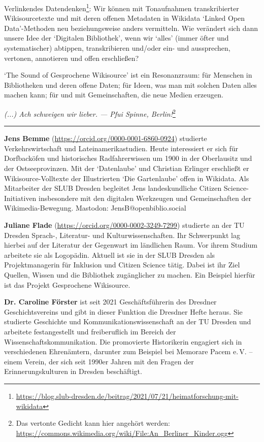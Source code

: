 \documentclass[a4paper,
fontsize=11pt,
oneside,
numbers=noperiodatend,
parskip=half-,
bibliography=totoc,
final
]{scrartcl}
\begin{document}
Verlinkendes Datendenken\footnote{\url{https://blog.slub-dresden.de/beitrag/2021/07/21/heimatforschung-mit-wikidata}}:
Wir können mit Tonaufnahmen transkribierter Wikisourcetexte und mit
deren offenen Metadaten in Wikidata \enquote*{Linked Open Data}-Methoden
neu beziehungsweise anders vermitteln. Wie verändert sich dann unsere
Idee der \enquote*{Digitalen Bibliothek}, wenn wir \enquote*{alles}
(immer öfter und systematischer) abtippen, transkribieren und/oder ein-
und aussprechen, vertonen, annotieren und offen erschließen?

\enquote*{The Sound of Gesprochene Wikisource} ist ein Resonanzraum: für
Menschen in Bibliotheken und deren offene Daten; für Ideen, was man mit
solchen Daten alles machen kann; für und mit Gemeinschaften, die neue
Medien erzeugen.

\begin{center}
\emph{(...) Ach schweigen wir lieber. --- Pfui Spinne, Berlin!}\footnote{Das vertonte Gedicht kann hier angehört werden: \url{https://commons.wikimedia.org/wiki/File:An\_Berliner\_Kinder.ogg}}
\end{center}

\begin{center}\rule{0.5\linewidth}{0.5pt}\end{center}

\textbf{Jens Bemme} (\url{https://orcid.org/0000-0001-6860-0924}) studierte Verkehrswirtschaft und Lateinamerikastudien. Heute interessiert er sich für Dorfbacköfen 
und historisches Radfahrerwissen um 1900 in der Oberlausitz und der Ostseeprovinzen. Mit der \enquote*{Datenlaube} und 
Christian Erlinger erschließt er Wikisource-Volltexte der Illustrierten \enquote*{Die Gartenlaube} offen in Wikidata. 
Als Mitarbeiter der SLUB Dresden begleitet Jens landeskundliche Citizen Science-Initiativen insbesondere mit 
den digitalen Werkzeugen und Gemeinschaften der Wikimedia-Bewegung. Mastodon: JensB@openbiblio.social


\textbf{Juliane Flade} (\url{https://orcid.org/0000-0002-3249-7299}) studierte an der TU Dresden Sprach-, Literatur- und Kulturwissenschaften. Ihr Schwerpunkt lag hierbei auf der Literatur der Gegenwart im ländlichen Raum. Vor ihrem Studium arbeitete sie als Logopädin. Aktuell ist sie in der SLUB Dresden als Projektmanagerin für Inklusion und Citizen Science tätig. Dabei ist ihr Ziel Quellen, Wissen und die Bibliothek zugänglicher zu machen. Ein Beispiel hierfür ist das Projekt Gesprochene Wikisource.


\textbf{Dr. Caroline Förster} ist seit 2021 Geschäftsführerin des Dresdner Geschichtsvereins und gibt in dieser Funktion 
die Dresdner Hefte heraus. Sie studierte Geschichte und Kommunikationswissenschaft an der TU Dresden und arbeitete 
festangestellt und freiberuflich im Bereich der Wissenschaftskommunikation. Die promovierte Historikerin engagiert 
sich in verschiedenen Ehrenämtern, darunter zum Beispiel bei Memorare Pacem e.\,V. – einem Verein, der sich seit 1990er 
Jahren mit den Fragen der Erinnerungskulturen in Dresden beschäftigt.
\end{document}
